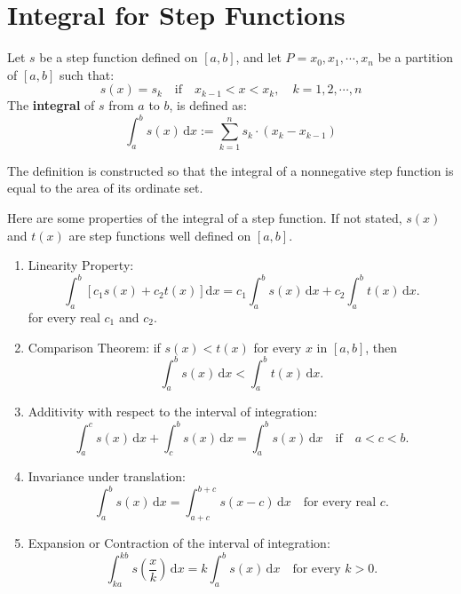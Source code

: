 	\section{Integral for Step Functions}
	\begin{definitionenv}
		Let $s$ be a step function defined on $[a,b]$, and let $P={x_0,x_1,\cdots,x_n}$ be a partition of $[a,b]$ such that:
		\[
		s(x)=s_k \quad \text{if}\quad x_{k-1}<x<x_k,\quad k=1,2,\cdots,n
		\]
		The \textbf{integral} of $s$ from $a$ to $b$, is defined as:
		\[
		\int_{a}^{b}s(x)\,\mathrm{d}x:=\sum_{k=1}^{n}s_k\cdot (x_k - x_{k-1})
		\]
	\end{definitionenv}
	\begin{remarkenv}
		The definition is constructed so that the integral of a nonnegative step function is equal to the area of its ordinate set.
	\end{remarkenv}
	\begin{theoremenv}
		Here are some properties of the integral of a step function. If not stated, $s(x)$ and $t(x)$ are step functions well defined on $[a,b]$.
		\begin{enumerate}
			\item Linearity Property: 
			\[
			\int_a^b \left[ c_1 s(x) + c_2 t(x) \right] \mathrm{d}x
			= c_1 \int_a^b s(x) \, \mathrm{d}x + c_2 \int_a^b t(x) \, \mathrm{d}x.
			\]
			for every real $c_1$ and $c_2$.
			\item Comparison Theorem: if $s(x)<t(x)$ for every $x$ in $[a,b]$, then
			\[
			\int_a^b s(x) \, \mathrm{d}x < \int_a^b t(x) \, \mathrm{d}x.
			\]
			\item Additivity with respect to the interval of integration:
			\[
			\int_a^c s(x) \, \mathrm{d}x + \int_c^b s(x) \, \mathrm{d}x = \int_a^b s(x) \, \mathrm{d}x 
			\quad \text{if} \quad a < c < b.
			\]
			\item  Invariance under translation:
			\[
			\int_a^b s(x) \, \mathrm{d}x = \int_{a+c}^{b+c} s(x - c) \, \mathrm{d}x 
			\quad \text{for every real } c.
			\]
			\item Expansion or Contraction of the interval of integration:
			\[
			\int_{ka}^{kb} s\!\left(\frac{x}{k}\right) \, \mathrm{d}x = 
			k \int_a^b s(x) \, \mathrm{d}x 
			\quad \text{for every } k > 0.
			\]
		\end{enumerate}
	\end{theoremenv}
